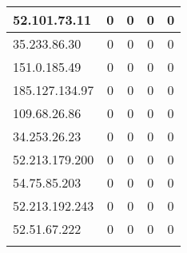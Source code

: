 \documentclass{article}
\begin{document}
\begin{longtable}{|>{\raggedright\arraybackslash}p{3cm}|c|c|c|c|}
    
    \rowcolor{lightgreen} %
    
    52.101.73.11 & 0 & 0 & 0 & 0 \\
    \hline
    
    
    \rowcolor{lightgreen} %
    
    35.233.86.30 & 0 & 0 & 0 & 0 \\
    \hline
    
    
    \rowcolor{lightgreen} %
    
    151.0.185.49 & 0 & 0 & 0 & 0 \\
    \hline
    
    
    \rowcolor{lightgreen} %
    
    185.127.134.97 & 0 & 0 & 0 & 0 \\
    \hline
    
    
    \rowcolor{lightgreen} %
    
    109.68.26.86 & 0 & 0 & 0 & 0 \\
    \hline
    
    
    \rowcolor{lightgreen} %
    
    34.253.26.23 & 0 & 0 & 0 & 0 \\
    \hline
    
    
    \rowcolor{lightgreen} %
    
    52.213.179.200 & 0 & 0 & 0 & 0 \\
    \hline
    
    
    \rowcolor{lightgreen} %
    
    54.75.85.203 & 0 & 0 & 0 & 0 \\
    \hline
    
    
    \rowcolor{lightgreen} %
    
    52.213.192.243 & 0 & 0 & 0 & 0 \\
    \hline
    
    
    \rowcolor{lightgreen} %
    
    52.51.67.222 & 0 & 0 & 0 & 0 \\
    \hline
    
    
    \rowcolor{lightgreen} %
    

\end{longtable}
\end{document}
